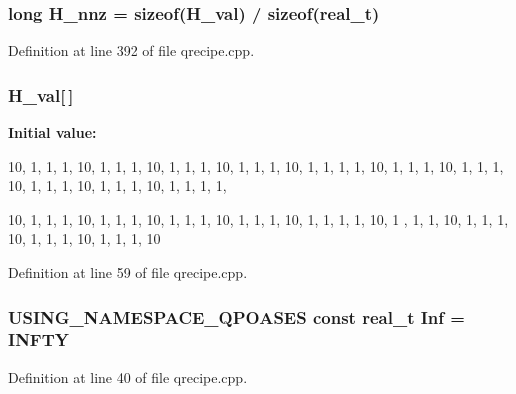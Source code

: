 \subsubsection[{H\_\-nnz}]{\setlength{\rightskip}{0pt plus 5cm}long {\bf H\_\-nnz} = sizeof({\bf H\_\-val}) / sizeof({\bf real\_\-t})}\label{qrecipe_8cpp_a46f53f4ab6dff7febae9799053664188}


Definition at line 392 of file qrecipe.cpp.

\subsubsection[{H\_\-val}]{ {\bf H\_\-val}[$\,$]}\label{qrecipe_8cpp_afb8cbf72d7053c0a2ef63e56218ea845}
{\bfseries Initial value:}
\begin{DoxyCode}
 {10, 1, 1, 1, 10, 1, 1, 1, 10, 1, 1, 1, 10, 1, 1, 1, 10, 1, 1,
        1, 1, 10, 1, 1, 1, 10, 1, 1, 1, 10, 1, 1, 1, 10, 1, 1, 1, 10, 1, 1, 1, 1,
      
        10, 1, 1, 1, 10, 1, 1, 1, 10, 1, 1, 1, 10, 1, 1, 1, 10, 1, 1, 1, 1, 10, 1
      ,
        1, 1, 10, 1, 1, 1, 10, 1, 1, 1, 10, 1, 1, 1, 10}
\end{DoxyCode}


Definition at line 59 of file qrecipe.cpp.

\subsubsection[{Inf}]{\setlength{\rightskip}{0pt plus 5cm}USING\_\-NAMESPACE\_\-QPOASES const {\bf real\_\-t} {\bf Inf} = {\bf INFTY}}\label{qrecipe_8cpp_a3cd84255413cf677e9585c1a26c3efda}


Definition at line 40 of file qrecipe.cpp.

